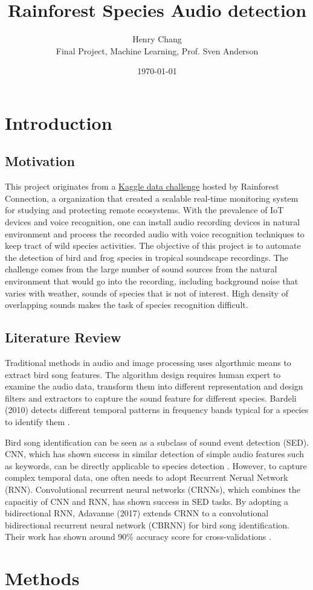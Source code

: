\documentclass[12pt]{article}
\title{Rainforest Species Audio detection}
\author{Henry Chang \\Final Project, Machine Learning, Prof. Sven Anderson}
\date{\today}
\begin{document}
\maketitle


\section{Introduction}

\subsection*{Motivation} \small{ 

This project originates from a \href{https://www.kaggle.com/c/rfcx-species-audio-detection/overview}{Kaggle data challenge} hosted by Rainforest Connection, a organization that created a scalable real-time monitoring system for studying and protecting remote ecosystems.  With the prevalence of IoT devices and voice recognition, one can install audio recording devices in natural environment and process the recorded audio with voice recognition techniques to keep tract of wild species activities. The objective of this project is to automate the detection of bird and frog species in tropical soundscape recordings. The challenge comes from the large number of sound sources from the natural environment that would go into the recording, including background noise that varies with weather, sounds of species that is not of interest. High density of overlapping sounds makes the task of species recognition difficult.

}\subsection*{Literature Review} \small{

Traditional methods in audio and image processing uses algorthmic means to extract bird song features. The algorithm design requires human expert to examine the audio data, transform them into different representation and design filters and extractors to capture the sound feature for different species. Bardeli (2010) detects different temporal patterns in frequency bands typical for a species to identify them \cite{BARDELI2010}.

Bird song identification can be seen as a subclass of sound event detection (SED). CNN, which has shown success in similar detection of simple audio features such as keywords, can be directly applicable to species detection \cite{KeywordRecognition}. However, to capture complex temporal data, one often needs to adopt Recurrent Nerual Network (RNN). Convolutional recurrent neural networks (CRNNs), which combines the capacitiy of CNN and RNN, has shown success in SED tasks. By adopting a bidirectional RNN, Adavanne (2017) extends CRNN to a convolutional bidirectional recurrent neural network (CBRNN) for bird song identification. Their work has shown around 90\% accuracy score for cross-validations \cite{RCNN}. 

}\section{Methods}
\end{document}
